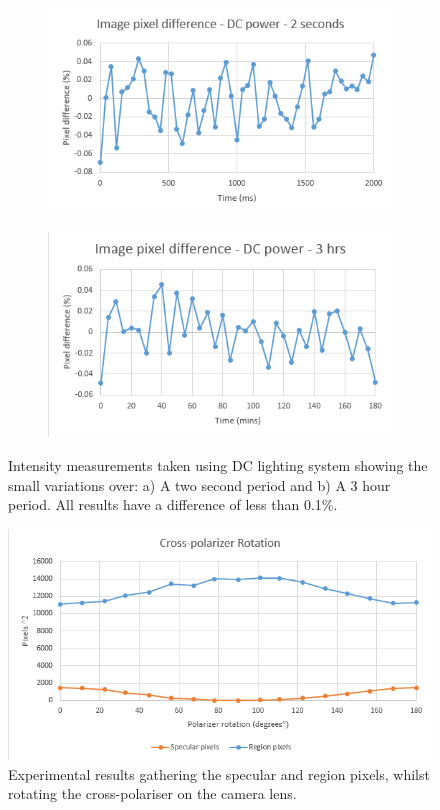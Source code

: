 \documentclass[fleqn,twoside,12pt]{report}
\begin{document}
\begin{figure}[h]
	\centering
	\begin{subfigure}{.45\textwidth}
		\centering
		\includegraphics[width=.95\linewidth]{image_diff_dc.png}
		\caption{}
		\label{fig:image_diff_dc}
	\end{subfigure}%
	\begin{subfigure}{.45\textwidth}
		\centering
		\includegraphics[width=.95\linewidth]{image_diff_dc_2.png}
		\caption{}
		\label{fig:image_diff_dc_2}
	\end{subfigure}%
	\caption{Intensity measurements taken using DC lighting system showing the small variations over: a) A two second period and b) A 3 hour period. All results have a difference of less than 0.1\%.}
	\label{fig:test4}
\end{figure}

\begin{figure}[h]
	\centering
	\includegraphics[width=.7\linewidth]{polarizer_rot.png}
	\caption{Experimental results gathering the specular and region pixels, whilst rotating the cross-polariser on the camera lens.}
	\label{fig:graph_polar}
\end{figure}
\end{document}
